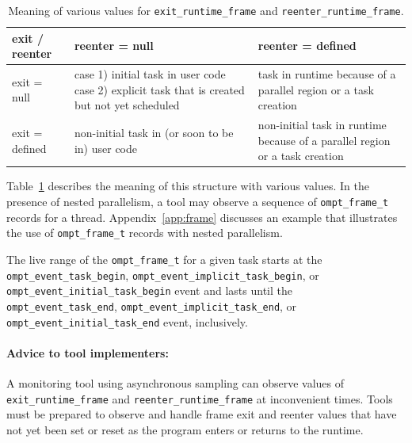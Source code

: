 \documentclass{article}
\begin{document}
\begin{table}
\begin{center}
\begin{tabular}{|l|p{2in}|p{2in}|}
\hline
exit / reenter 	& reenter = null										& reenter = defined \\\hline\hline
exit = null		& case 1)  initial task in user code case 2) explicit task that is created but not yet scheduled &  task in runtime because of a parallel region or a task creation \\\hline
exit = defined 	& non-initial task in (or soon to be in) user code							& non-initial task in runtime because of a parallel region or a task creation\\\hline
\end{tabular}
\end{center}
\caption{Meaning of various values for {\tt exit\_runtime\_frame} and {\tt reenter\_runtime\_frame}.}
\label{tab:frame}
\end{table}

\noindent
Table~\ref{tab:frame} describes the meaning of this structure with various values.
In the presence of nested parallelism, a tool may observe a sequence of \verb|ompt_frame_t| records for a thread. Appendix~\ref{app:frame} discusses  an example that illustrates the use of \verb|ompt_frame_t| records with nested parallelism.

 \sloppy
  The live range of the \verb|ompt_frame_t| for a given task starts at 
  the \verb|ompt_event_task_begin|, \verb|ompt_event_implicit_task_begin|, or \verb|ompt_event_initial_task_begin| event and 
  lasts until the \verb|ompt_event_task_end|, \verb|ompt_event_implicit_task_end|, or \verb|ompt_event_initial_task_end|  event, inclusively.

\paragraph{Advice to tool implementers:} A monitoring tool using
      asynchronous sampling can observe values of 
      \verb|exit_runtime_frame| and \verb|reenter_runtime_frame| at inconvenient times. 
      Tools must be prepared to observe and handle frame exit and reenter values that have not yet been set or reset as the program enters or returns to the runtime. 

\end{document}
